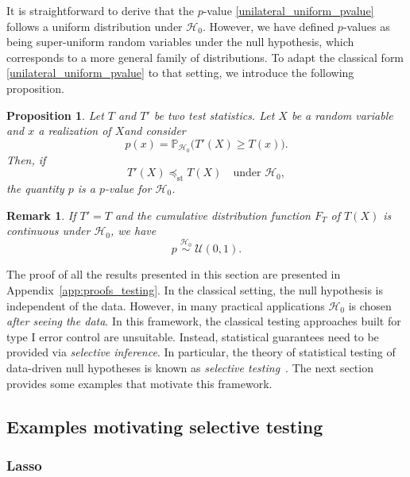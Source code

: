 \documentclass[a4paper,11pt]{article}
\theoremstyle{plain}
\newcommand{\1}{\mathbf{1}}
\newtheorem{proposition}{Proposition}
\newtheorem{remark}{Remark}
\begin{document}
It is straightforward to derive that the $p$-value \eqref{unilateral_uniform_pvalue} follows a uniform distribution under $\mathcal{H}_0$. However, we have defined $p$-values as being super-uniform random variables under the null hypothesis, which corresponds to a more general family of distributions. To adapt the classical form \eqref{unilateral_uniform_pvalue} to that setting, we introduce the following proposition.

\begin{proposition}\label{prop_test_stat_pvalue}
Let \(T\) and \(T'\) be two test statistics. Let \(X\) be a random variable and \(x\) a realization of \(X\)and consider
\begin{equation}
p(x) = \mathbb{P}_{\mathcal{H}_0}\!\bigl(T'(X) \ge T(x)\bigr).
\end{equation}
Then, if
\begin{equation}
T'(X) \preceq_{\mathrm{st}} T(X)
\quad \text{under } \mathcal{H}_0,
\end{equation}
the quantity \(p\) is a $p$-value for \(\mathcal{H}_0\).
\end{proposition}
\begin{remark}\label{remark_equal_statistics}
If \(T' = T\) and the cumulative distribution function \(F_T\) of \(T(X)\) is continuous
under \(\mathcal{H}_0\), we have
\[
p \;\overset{\mathcal{H}_0}{\sim}\; \mathcal{U}(0,1).
\]
\end{remark}

The proof of all the results presented in this section are presented in Appendix~\ref{app:proofs_testing}. In the classical setting, the null hypothesis is independent of the data. However, in many practical applications  $\mathcal{H}_0$ is chosen \textit{after seeing the data}. In this framework, the classical testing approaches built for type I error control are unsuitable. Instead, statistical guarantees need to be provided via \textit{selective inference}. In particular, the theory of statistical testing of data-driven null hypotheses is known as \textit{selective testing}~\cite{fithian}. The next section provides some examples that motivate this framework. 

\subsection{Examples motivating selective testing}

\subsubsection{Lasso}
\end{document}
